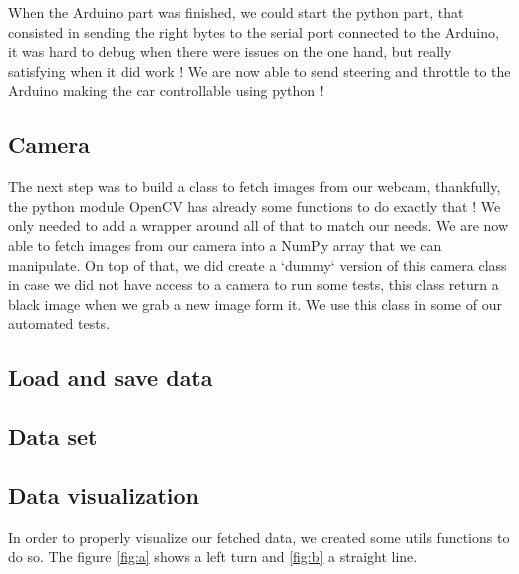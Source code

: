 \documentclass[12pt]{article}
\begin{document}
When the Arduino part was finished, we could start the python part, that consisted in sending the right bytes to the serial port connected to the Arduino, it was hard to debug when there were issues on the one hand, but really satisfying when it did work ! We are now able to send steering and throttle to the Arduino making the car controllable using python !

\subsection{Camera}
The next step was to build a class to fetch images from our webcam, thankfully, the python module OpenCV has already some functions to do exactly that ! 
We only needed to add a wrapper around all of that to match our needs. We are now able to fetch images from our camera into a NumPy array that we can manipulate. On top of that, we did create a `dummy` version of this camera class in case we did not have access to a camera to run some tests, this class return a black image when we grab a new image form it. We use this class in some of our automated tests.

\subsection{Load and save data}

\subsection{Data set}

\subsection{Data visualization}
In order to properly visualize our fetched data, we created some utils functions to do so.
The figure \ref{fig:a} shows a left turn and \ref{fig:b} a straight line.
\end{document}
